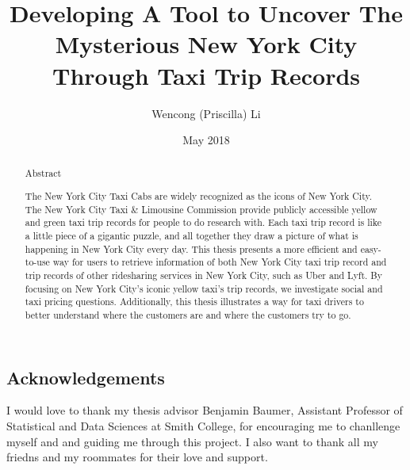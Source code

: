 \documentclass[12pt,twoside]{reedthesis}
\title{Developing A Tool to Uncover The Mysterious New York City Through Taxi
Trip Records}
\author{Wencong (Priscilla) Li}
\date{May 2018}
\theoremstyle{definition}
\theoremstyle{definition}
\theoremstyle{definition}
\theoremstyle{remark}
\begin{document}
  \maketitle

\frontmatter %
\pagestyle{empty} %
  \begin{acknowledgements}
    \chapter*{Acknowledgements}\label{acknowledgements}
    
    I would love to thank my thesis advisor Benjamin Baumer, Assistant
    Professor of Statistical and Data Sciences at Smith College, for
    encouraging me to chanllenge myself and and guiding me through this
    project. I also want to thank all my friedns and my roommates for their
    love and support.
  \end{acknowledgements}

  \hypersetup{linkcolor=black}
  \setcounter{tocdepth}{2}
  \tableofcontents

  \listoftables

  \listoffigures
  \begin{abstract}
    \chapter*{Abstract}\label{abstract}
    
    The New York City Taxi Cabs are widely recognized as the icons of New
    York City. The New York City Taxi \& Limousine Commission provide
    publicly accessible yellow and green taxi trip records for people to do
    research with. Each taxi trip record is like a little piece of a
    gigantic puzzle, and all together they draw a picture of what is
    happening in New York City every day. This thesis presents a more
    efficient and easy-to-use way for users to retrieve information of both
    New York City taxi trip record and trip records of other ridesharing
    services in New York City, such as Uber and Lyft. By focusing on New
    York City's iconic yellow taxi's trip records, we investigate social and
    taxi pricing questions. Additionally, this thesis illustrates a way for
    taxi drivers to better understand where the customers are and where the
    customers try to go.
  \end{abstract}
\end{document}
